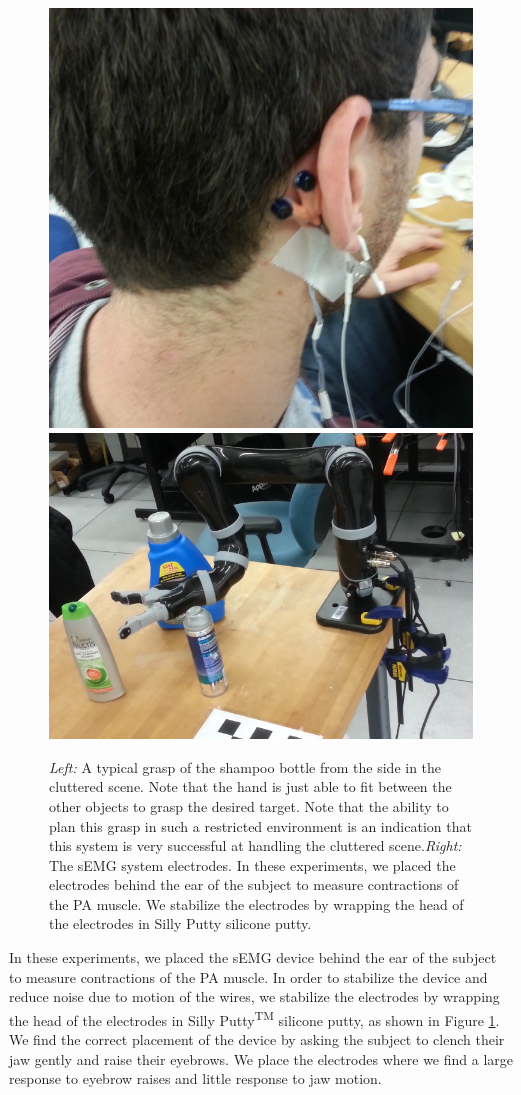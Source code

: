\begin{figure}
\centering
\includegraphics[width=.49\textwidth,trim={30cm 40cm 20cm 20cm},clip=true]{user_semg_2.jpg}
\includegraphics[width=.49\textwidth]{images_4/semg_clutter_grasp.png}
\caption{\emph{Left:} A typical grasp of the shampoo bottle from the side in the cluttered scene. Note that the hand is just able to fit between the other objects to grasp the desired target. Note that the ability to plan this grasp in such a restricted environment is an indication that this system is very successful at handling the cluttered scene.\emph{Right:} The sEMG system electrodes. In these experiments, we placed the electrodes behind the ear of the subject to measure contractions of the PA muscle. We stabilize the electrodes by wrapping the head of the electrodes in Silly Putty silicone putty.}

\label{fig:silly-putty}
\end{figure}

In these experiments, we placed the sEMG device behind the ear of the subject to measure contractions of the PA muscle. In order to stabilize the device and reduce noise due to motion of the wires, we stabilize the electrodes by wrapping the head of the electrodes in Silly Putty\textsuperscript{TM} silicone putty, as shown in Figure \ref{fig:silly-putty}. We find the correct placement of the device by asking the subject to clench their jaw gently and raise their eyebrows. We place the electrodes where we find a large response to eyebrow raises and  little response to jaw motion.

